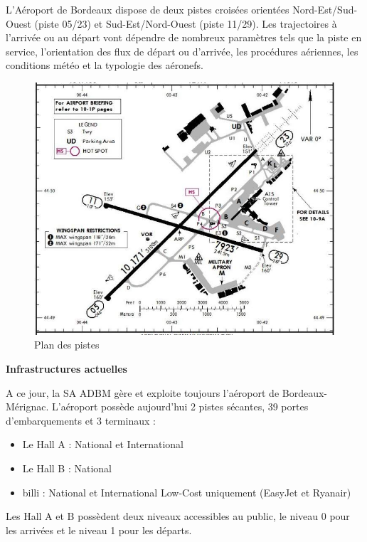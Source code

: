 L’Aéroport de Bordeaux dispose de deux pistes croisées orientées Nord-Est/Sud-Ouest (piste 05/23) et Sud-Est/Nord-Ouest (piste 11/29). Les trajectoires à l’arrivée ou au départ vont dépendre de nombreux paramètres tels que la piste en service, l’orientation des flux de départ ou d’arrivée, les procédures aériennes, les conditions météo et la typologie des aéronefs.\newline

\begin{figure}[hbt!]
  \centering
  \includegraphics[width=12.1cm]{Images/pistes.jpg}
  \caption{Plan des pistes}
  \label{fig:pistes}
\end{figure}

\newpage

\textbf{Infrastructures actuelles}\newline


A ce jour, la SA ADBM gère et exploite toujours l'aéroport de Bordeaux-Mérignac.
L'aéroport possède aujourd'hui 2 pistes sécantes, 39 portes d'embarquements et 3 terminaux :

\begin{itemize}
    \item Le Hall A : National et International
    \item Le Hall B : National
    \item billi : National et International Low-Cost uniquement (EasyJet et Ryanair)\newline
\end{itemize}

Les Hall A et B possèdent deux niveaux accessibles au public, le niveau 0 pour les arrivées et le niveau 1 pour les départs.

